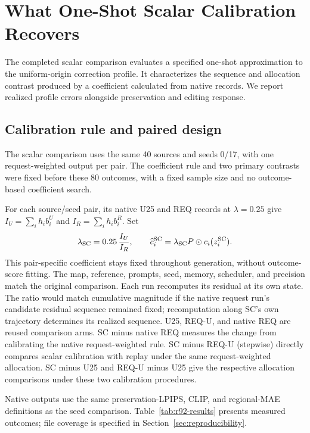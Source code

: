 \documentclass[10pt,doubleanonymous]{ieeeconf}
\begin{document}
\section{What One-Shot Scalar Calibration Recovers}
\label{sec:scalar-complete}
The completed scalar comparison evaluates a specified one-shot approximation to the uniform-origin correction profile. It characterizes the sequence and allocation contrast produced by a coefficient calculated from native records. We report realized profile errors alongside preservation and editing response.
\subsection{Calibration rule and paired design}
The scalar comparison uses the same 40 sources and seeds 0/17, with one request-weighted output per pair. The coefficient rule and two primary contrasts were fixed before these 80 outcomes, with a fixed sample size and no outcome-based coefficient search.

For each source/seed pair, its native U25 and REQ records at $\lambda=0.25$ give $I_U=\sum_i h_i b_i^U$ and $I_R=\sum_i h_i b_i^R$. Set
\begin{equation}
\lambda_{\rm SC}=0.25\,\frac{I_U}{I_R},\qquad
\widehat c_i^{\rm SC}=\lambda_{\rm SC}P\odot c_i(z_i^{\rm SC}).
\end{equation}
This pair-specific coefficient stays fixed throughout generation, without outcome-score fitting. The map, reference, prompts, seed, memory, scheduler, and precision match the original comparison. Each run recomputes its residual at its own state. The ratio would match cumulative magnitude if the native request run's candidate residual sequence remained fixed; recomputation along SC's own trajectory determines its realized sequence. U25, REQ-U, and native REQ are reused comparison arms. SC minus native REQ measures the change from calibrating the native request-weighted rule. SC minus REQ-U (stepwise) directly compares scalar calibration with replay under the same request-weighted allocation. SC minus U25 and REQ-U minus U25 give the respective allocation comparisons under these two calibration procedures.

Native outputs use the same preservation-LPIPS, CLIP, and regional-MAE definitions as the seed comparison. Table~\ref{tab:r92-results} presents measured outcomes; file coverage is specified in Section~\ref{sec:reproducibility}.
\end{document}
